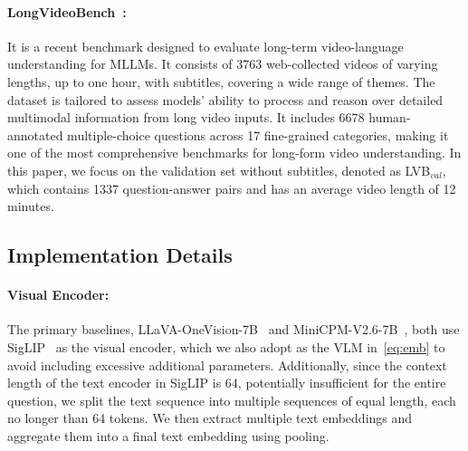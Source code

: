 \paragraph{LongVideoBench~\cite{wu2024longvideobench}:}  
It is a recent benchmark designed to evaluate long-term video-language understanding for MLLMs.
It consists of 3763 web-collected videos of varying lengths, up to one hour, with subtitles, covering a wide range of themes.
The dataset is tailored to assess models' ability to process and reason over detailed multimodal information from long video inputs.
It includes 6678 human-annotated multiple-choice questions across 17 fine-grained categories, making it one of the most comprehensive benchmarks for long-form video understanding.
In this paper, we focus on the validation set without subtitles, denoted as LVB$_{val}$, which contains 1337 question-answer pairs and has an average video length of 12 minutes.



\subsection{Implementation Details}

\paragraph{Visual Encoder:}
The primary baselines, LLaVA-OneVision-7B~\cite{li2024llava} and MiniCPM-V2.6-7B~\cite{yao2024minicpm}, both use SigLIP~\cite{zhai2023sigmoid} as the visual encoder,
which we also adopt as the VLM in~\cref{eq:emb} to avoid including excessive additional parameters. 
Additionally, since the context length of the text encoder in SigLIP is 64, potentially insufficient for the entire question, 
we split the text sequence into multiple sequences of equal length, each no longer than 64 tokens.
We then extract multiple text embeddings and aggregate them into a final text embedding using pooling.



